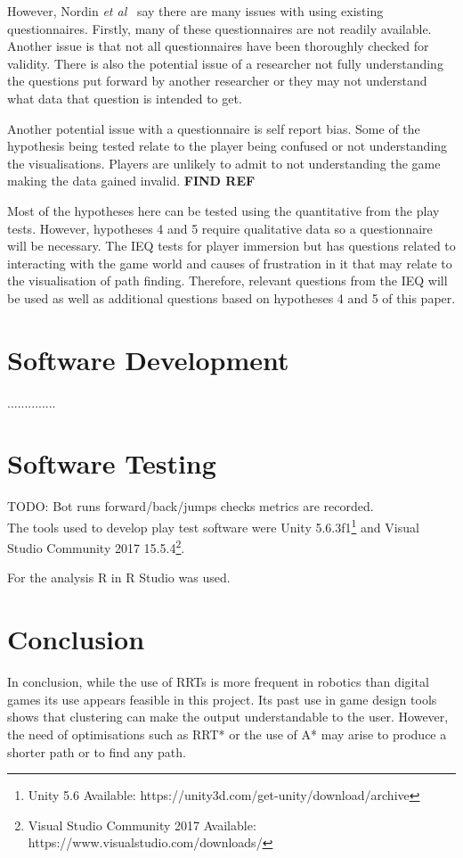 \documentclass[journal]{IEEEtran}
\begin{document}
However, Nordin \textit{et al}~\cite{nordin2014} say there are many issues with using existing questionnaires. Firstly, many of these questionnaires are not readily available. Another issue is that not all questionnaires have been thoroughly checked for validity. There is also the potential issue of a researcher not fully understanding the questions put forward by another researcher or they may not understand what data that question is intended to get.

Another potential issue with a questionnaire is self report bias. Some of the hypothesis being tested relate to the player being confused or not understanding the visualisations. Players are unlikely to admit to not understanding the game making the data gained invalid. \textbf{FIND REF}

Most of the hypotheses here can be tested using the quantitative from the play tests. However, hypotheses 4 and 5 require qualitative data so a questionnaire will be necessary. The IEQ tests for player immersion but has questions related to interacting with the game world and causes of frustration in it that may relate to the visualisation of path finding.  Therefore, relevant questions from the IEQ will be used as well as additional questions based on hypotheses 4 and 5 of this paper.


\section{Software Development} \label{softdev}
..............
\section{Software Testing} \label{softtest}
TODO: Bot runs forward/back/jumps checks metrics are recorded. \\ 
The tools used to develop play test software were Unity 5.6.3f1\footnote[3]{Unity 5.6 Available: https://unity3d.com/get-unity/download/archive} and Visual Studio Community 2017  15.5.4\footnote[4]{Visual Studio Community 2017 Available: https://www.visualstudio.com/downloads/}.

For the analysis R in R Studio was used.


\section{Conclusion}
In conclusion, while the use of RRTs is more frequent in robotics than digital games its use appears feasible in this project. Its past use in game design tools shows that clustering can make the output understandable to the user. However, the need of optimisations such as RRT* or the use of A* may arise to produce a shorter path or to find any path. 
\end{document}

